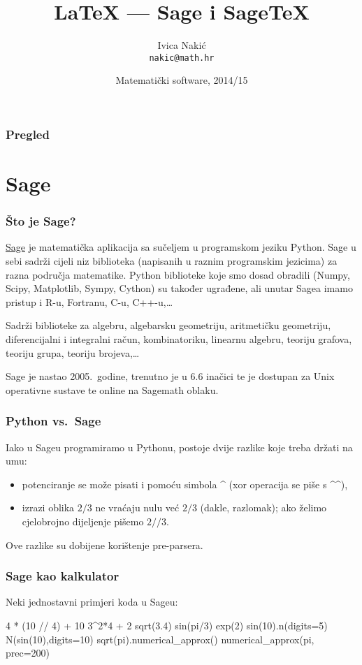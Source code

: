 \documentclass{beamer}
\title{\LaTeX{} --- Sage i Sage\TeX}
\subtitle{}
\author{Ivica Nakić \\ \texttt{nakic@math.hr}}
\institute[PMF--MO]{Matematički odsjek Prirodoslovno--matematičkog fakulteta}
\date[2014/15]{Matematički software, 2014/15}
\begin{document}
\begin{frame}
  \maketitle  
\end{frame}

\begin{frame}
\frametitle{Pregled}
  \tableofcontents  
\end{frame}

\section{Sage}

\begin{frame}
\frametitle{Što je Sage?}
\href{http://www.sagemath.org}{Sage} je matematička aplikacija sa sučeljem u programskom jeziku Python. Sage u sebi sadrži cijeli niz biblioteka (napisanih u raznim programskim jezicima) za razna područja matematike. Python biblioteke koje smo dosad obradili (Numpy, Scipy, Matplotlib, Sympy, Cython) su također ugrađene, ali unutar Sagea imamo pristup i R-u, Fortranu, C-u, C++-u,\ldots   
\pause

Sadrži biblioteke za algebru, algebarsku geometriju, aritmetičku geometriju, diferencijalni i integralni račun, kombinatoriku, linearnu algebru, teoriju grafova, teoriju grupa, teoriju brojeva,\ldots
\pause

Sage je nastao 2005.\ godine, trenutno je u 6.6 inačici te je dostupan za Unix operativne sustave te online na Sagemath oblaku.
\end{frame}

\begin{frame}
\frametitle{Python vs.\ Sage}
Iako u Sageu programiramo u Pythonu, postoje dvije razlike koje treba držati na umu:
\begin{itemize}
     \item potenciranje se može pisati i pomoću simbola \textasciicircum{} (xor operacija se piše s \textasciicircum\textasciicircum),
     \item izrazi oblika $2/3$ ne vraćaju nulu već $2/3$ (dakle, razlomak); ako želimo cjelobrojno dijeljenje pišemo $2//3$.
   \end{itemize}   
Ove razlike su dobijene korištenje pre-parsera.

\end{frame}

\begin{frame}[fragile]
\frametitle{Sage kao kalkulator}
Neki jednostavni primjeri koda u Sageu:

\begin{sageblock}
4 * (10 // 4) + 10 %
3^2*4 + 2%
sqrt(3.4)
sin(pi/3)
exp(2)
sin(10).n(digits=5)
N(sin(10),digits=10)
sqrt(pi).numerical_approx()
numerical_approx(pi, prec=200)
\end{sageblock}

\end{frame}
\end{document}
